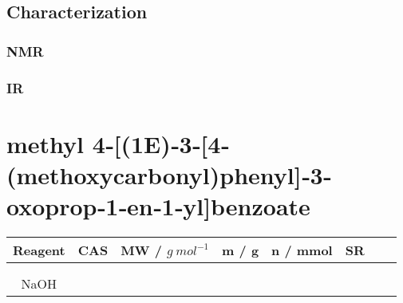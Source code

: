 \documentclass[../Master.tex]{subfiles}
\begin{document}
\subsection{Characterization}
\subsubsection{NMR}
\subsubsection{IR}

\section{methyl 4‐[(1E)‐3‐[4‐(methoxycarbonyl)phenyl]‐3‐oxoprop‐1‐en‐1‐yl]benzoate}

\begin{center}
	\begin{tabular}[b]{cccccccc}
		\toprule
		Reagent & CAS & MW / \(g \ mol^{-1}\) & m / g & n / mmol & SR \\
		\midrule
		        &     &                       &       &          &    \\
		        &     &                       &       &          &    \\
		NaOH    &     &                       &       &          &    \\
		\bottomrule
	\end{tabular}
\end{center}
\end{document}
